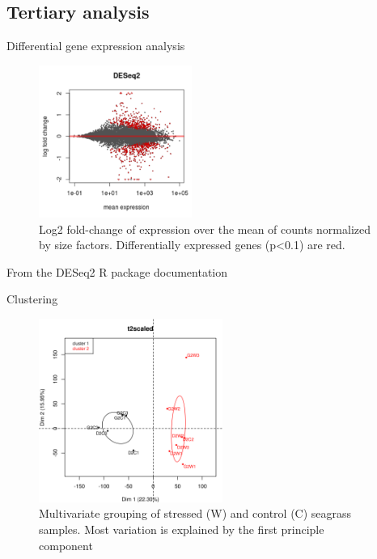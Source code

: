 \documentclass[presentation]{beamer}
\begin{document}
\subsection{Tertiary analysis}
\label{sec-4-1}
\begin{frame}[label=sec-4-1-1]{Differential gene expression analysis}

\begin{center}
\begin{figure}[htb]
\centering
\includegraphics[width=5cm]{MAplot_DESeq2.png}
\caption{Log2 fold-change of expression over the mean of counts normalized by size factors. Differentially expressed genes (p<0.1) are red.}
\end{figure}

\tiny{From the DESeq2 R package documentation}
\end{center}
\end{frame}




\begin{frame}[label=sec-4-1-2]{Clustering}
\begin{figure}[htb]
\centering
\includegraphics[width=6cm]{t2scaled_PCA.png}
\caption{Multivariate grouping of stressed (W) and control (C) seagrass samples. Most variation is explained by the first principle component}
\end{figure}
\end{frame}
\end{document}
